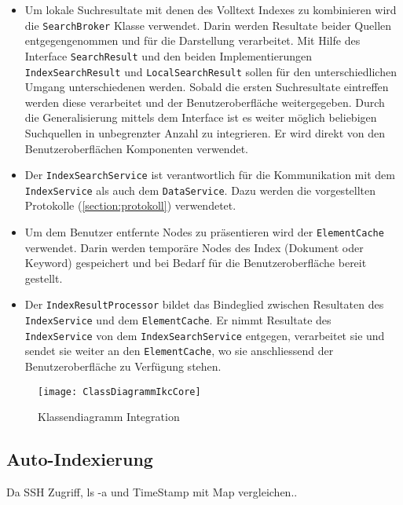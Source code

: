 \begin{itemize}
    \item Um lokale Suchresultate mit denen des Volltext Indexes zu kombinieren wird die \texttt{SearchBroker} Klasse verwendet. Darin werden Resultate beider Quellen entgegengenommen und für die Darstellung verarbeitet. Mit Hilfe des Interface \texttt{SearchResult} und den beiden Implementierungen \texttt{IndexSearchResult} und \texttt{LocalSearchResult} sollen für den unterschiedlichen Umgang unterschiedenen werden. Sobald die ersten Suchresultate eintreffen werden diese verarbeitet und der Benutzeroberfläche weitergegeben. Durch die Generalisierung mittels dem Interface ist es weiter möglich beliebigen Suchquellen in unbegrenzter Anzahl zu integrieren. Er wird direkt von den Benutzeroberflächen Komponenten verwendet. 
    \item Der \texttt{IndexSearchService} ist verantwortlich für die Kommunikation mit dem \texttt{IndexService} als auch dem \texttt{DataService}. Dazu werden die vorgestellten Protokolle (\autoref{section:protokoll}) verwendetet.
    \item Um  dem Benutzer entfernte Nodes zu präsentieren wird der \texttt{ElementCache} verwendet. Darin werden temporäre Nodes des Index (Dokument oder \gls{Keyword}) gespeichert und bei Bedarf für die Benutzeroberfläche bereit gestellt.
    \item Der \texttt{IndexResultProcessor} bildet das Bindeglied zwischen Resultaten des \texttt{IndexService} und dem \texttt{ElementCache}. Er nimmt Resultate des \texttt{IndexService} von dem \texttt{IndexSearchService} entgegen, verarbeitet sie und sendet sie weiter an den \texttt{ElementCache}, wo sie anschliessend der Benutzeroberfläche zu Verfügung stehen.

\end{itemize}


    \begin{figure}[H]
    \centering
    \texttt{[image: ClassDiagrammIkcCore]}
    \caption{Klassendiagramm Integration}
    \label{fig:classDiagrammIkcCore}
    \end{figure}


\subsection{Auto-Indexierung}

Da SSH Zugriff, ls -a und TimeStamp mit Map vergleichen..

